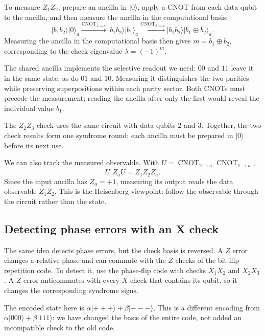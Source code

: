 \documentclass[11pt,a4paper]{article}
\newcommand{\ket}[1]{\lvert #1\rangle}
\newcommand{\cnot}{\operatorname{CNOT}}
\begin{document}
To measure \(Z_1Z_2\), prepare an ancilla in \(\ket0\), apply a CNOT
from each data qubit to the ancilla, and then measure the ancilla in
the computational basis:
\begin{equation}\label{eq:zz-extraction}
\ket{b_1b_2}\ket0_a
\xrightarrow{\mathrm{CNOT}_{1\to a}}
\ket{b_1b_2}\ket{b_1}_a
\xrightarrow{\mathrm{CNOT}_{2\to a}}
\ket{b_1b_2}\ket{b_1\oplus b_2}_a.
\end{equation}
Measuring the ancilla in the computational basis then gives
\(m=b_1\oplus b_2\), corresponding to the check eigenvalue
\(\lambda=(-1)^m\).


The shared ancilla implements the selective readout we need: \(00\)
and \(11\) leave it in the same state, as do \(01\) and \(10\).
Measuring it distinguishes the two parities while preserving
superpositions within each parity sector. Both CNOTs must precede
the measurement; reading the ancilla after only the first would
reveal the individual value \(b_1\).

The \(Z_2Z_3\) check uses the same circuit with data qubits \(2\)
and \(3\). Together, the two check results form one syndrome round;
each ancilla must be prepared in \(\ket0\) before its next use.

We can also track the measured observable. With
\(U=\cnot_{2\to a}\cnot_{1\to a}\),
\begin{equation}
U^\dagger Z_aU=Z_1Z_2Z_a.
\end{equation}
Since the input ancilla has \(Z_a=+1\), measuring its output reads
the data observable \(Z_1Z_2\). This is the Heisenberg viewpoint:
follow the observable through the circuit rather than the state.

\subsection{Detecting phase errors with an X check}
The same idea detects phase errors, but the check basis is reversed. A
$Z$ error changes a relative phase and can commute with the $Z$ checks
of the bit-flip repetition code. To detect it, use the phase-flip code
with checks $X_1X_2$ and $X_2X_3$. A $Z$ error anticommutes with every
$X$ check that contains its qubit, so it changes the corresponding
syndrome signs.

The encoded state here is $\alpha\ket{+++}+\beta\ket{---}$.
This is a different encoding from $\alpha\ket{000}+\beta\ket{111}$:
we have changed the basis of the entire code, not added an incompatible
check to the old code.
\end{document}
